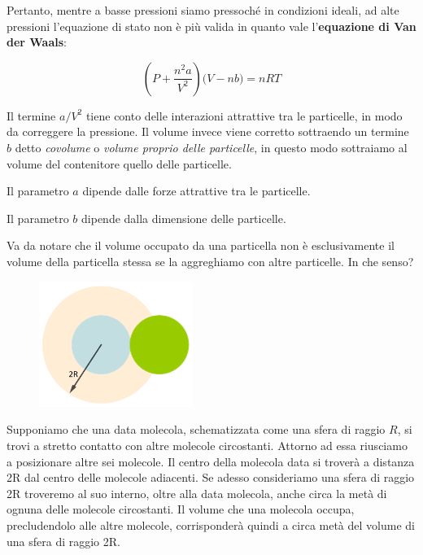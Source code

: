 Pertanto, mentre a basse pressioni siamo pressoché in condizioni ideali, ad alte pressioni l'equazione di stato non è più valida in quanto vale l'\textbf{equazione di Van der Waals}:

$$\left( P + \frac{n^2a}{V^2} \right)\big(V-nb\big)=nRT$$

Il termine $a/V^2$ tiene conto delle interazioni attrattive tra le particelle, in modo da correggere la pressione. Il volume invece viene corretto sottraendo un termine $b$ detto \textit{covolume} o \textit{volume proprio delle particelle}, in questo modo sottraiamo al volume del contenitore quello delle particelle.

Il parametro $a$ dipende dalle forze attrattive tra le particelle.

Il parametro $b$ dipende dalla dimensione delle particelle.

\vspace{0.2cm}Va da notare che il volume occupato da una particella non è esclusivamente il volume della particella stessa se la aggreghiamo con altre particelle. In che senso?

\begin{minipage}{0.34 \textwidth}
    \begin{figure}[H]
        \includegraphics[width=5cm]{immagini/particelle_aggregate.png}
    \end{figure}
\end{minipage}
\begin{minipage}{0.65 \textwidth}
    \vspace{0.8cm}Supponiamo che una data molecola, schematizzata come una sfera di raggio $R$, si trovi a stretto contatto con altre molecole circostanti. Attorno ad essa riusciamo a posizionare altre sei molecole.
    Il centro della molecola data si troverà a distanza 2R dal centro delle molecole adiacenti. Se adesso consideriamo una sfera di raggio 2R troveremo al suo interno, oltre alla data molecola, anche circa la metà di ognuna delle molecole circostanti.
    Il volume che una molecola occupa, precludendolo alle altre molecole, corrisponderà quindi a circa metà del volume di una sfera di raggio 2R. 
\end{minipage}

